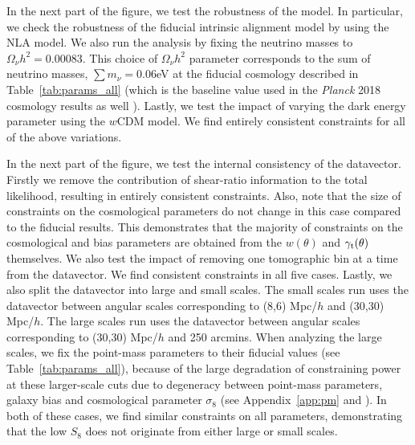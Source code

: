 \documentclass[aps, prd,twocolumn,superscriptaddress,nofootinbib,preprintnumbers]{revtex4-1}
\newcommand{\gammat}{\ensuremath{\gamma_{\rm t}(\theta)}}
\newcommand{\wtheta}{\ensuremath{w(\theta)}}
\begin{document}
In the next part of the figure, we test the robustness of the model. In particular, we check the robustness of the fiducial intrinsic alignment model by using the NLA model. We also run the analysis by fixing the neutrino masses to $\Omega_{\nu}h^2 = 0.00083$. This choice of $\Omega_{\nu}h^2$ parameter corresponds to the sum of neutrino masses, $\sum m_{\nu}=0.06$eV at the fiducial cosmology described in Table~\ref{tab:params_all} (which is the baseline value used in the \textit{Planck} 2018 cosmology results as well \citep{Planck_2018_cosmo}). Lastly, we test the impact of varying the dark energy parameter using the $w$CDM model. We find entirely consistent constraints for all of the above variations. 

In the next part of the figure, we test the internal consistency of the datavector. Firstly we remove the contribution of shear-ratio information to the total likelihood, resulting in entirely consistent constraints. Also, note that the size of constraints on the cosmological parameters do not change in this case compared to the fiducial results. This demonstrates that the majority of constraints on the cosmological and bias parameters are obtained from the $\wtheta$ and $\gammat$ themselves. We also test the impact of removing one tomographic bin at a time from the datavector. We find consistent constraints in all five cases. %
Lastly, we also split the datavector into large and small scales. The small scales run uses the datavector between  angular scales corresponding to (8,6) Mpc/$h$ and (30,30) Mpc/$h$. The large scales run uses the datavector between angular scales corresponding to (30,30) Mpc/$h$ and 250 arcmins. When analyzing the large scales, we fix the point-mass parameters to their fiducial values (see Table~\ref{tab:params_all}), because of the large degradation of constraining power at these larger-scale cuts due to degeneracy between point-mass parameters, galaxy bias and cosmological parameter $\sigma_8$ (see Appendix~\ref{app:pm} and \citet{MacCrann:2019ntb}). In both of these cases, we find similar constraints on all parameters, demonstrating that the low $S_8$ does not originate from either large or small scales.
\end{document}
